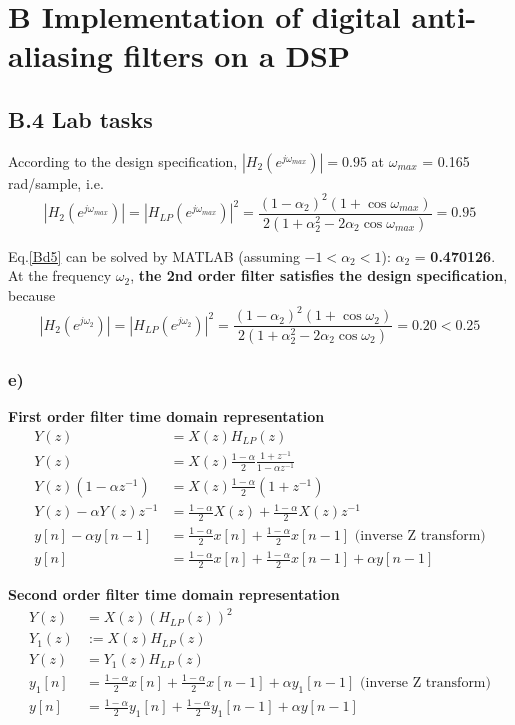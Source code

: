 \documentclass{article}
\newenvironment{homeworkProblem}[1]{
	\section*{#1}
	}{
}
\newenvironment{homeworkSection}[1]{
	\subsection*{#1}
	}{
}
\newcommand{\problemAnswer}[1]{
	\noindent\framebox[\columnwidth][c]{
		\begin{minipage}{0.98\columnwidth}
			#1
		\end{minipage}
	}
}
\begin{document}
\begin{homeworkProblem}{B Implementation of digital anti-aliasing filters on a DSP}
\begin{homeworkSection}{B.4 Lab tasks}
According to the design specification, $|H_2(e^{j\omega_{max}})| = 0.95$ at $\omega_{max}$ = 0.165 rad/sample, i.e.
\begin{equation}\label{Bd5}
|H_2(e^{j\omega_{max}})| = |H_{LP}(e^{j\omega_{max}})|^2=\frac{(1-\alpha_2)^2(1+\cos\omega_{max})}{2(1+\alpha_2^2-2\alpha_2\cos\omega_{max})} = 0.95
\end{equation}

Eq.\ref{Bd5} can be solved by MATLAB (assuming $-1 < \alpha_2 < 1$): $\alpha_2$ = \textbf{0.470126}.\\

At the frequency $\omega_2$, \textbf{the 2nd order filter satisfies the design specification}, because
\begin{equation}\label{Bd6}
|H_2(e^{j\omega_2})| = |H_{LP}(e^{j\omega_2})|^2=\frac{(1-\alpha_2)^2(1+\cos\omega_2)}{2(1+\alpha_2^2-2\alpha_2\cos\omega_2)} = 0.20 < 0.25
\end{equation}

\problemAnswer{
\vspace{5pt}
	
}


\subsubsection*{e)}

\textbf{First order filter time domain representation}
\begin{align*}
Y(z) &= X(z) H_{LP}(z)\\
Y(z) &= X(z) \frac{1-\alpha}{2}\frac{1+z^{-1}}{1-\alpha z^{-1}}\\
Y(z) (1-\alpha z^{-1}) &= X(z) \frac{1-\alpha}{2} (1+z^{-1})\\
Y(z) - \alpha Y(z) z^{-1} &= \frac{1-\alpha}{2} X(z) + \frac{1-\alpha}{2} X(z) z^{-1}\\
y[n] - \alpha y[n-1] &= \frac{1-\alpha}{2} x[n] + \frac{1-\alpha}{2} x[n-1] \text{ (inverse Z transform)}\\
y[n] &= \frac{1-\alpha}{2} x[n] + \frac{1-\alpha}{2} x[n-1] + \alpha y[n-1]
\end{align*}

\textbf{Second order filter time domain representation}
\begin{align*}
Y(z) &= X(z) (H_{LP}(z))^2\\
Y_1(z) &:= X(z) H_{LP}(z)\\
Y(z) &= Y_1(z) H_{LP}(z)\\
y_1[n] &= \frac{1-\alpha}{2} x[n] + \frac{1-\alpha}{2} x[n-1] + \alpha y_1[n-1] \text{ (inverse Z transform)}\\
y[n] &= \frac{1-\alpha}{2} y_1[n] + \frac{1-\alpha}{2} y_1[n-1] + \alpha y[n-1]
\end{align*}


\end{homeworkSection}
\end{homeworkProblem}
\end{document}
